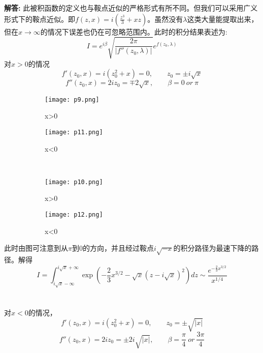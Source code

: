 \documentclass[12pt, a4paper, oneside]{ctexart}
\newenvironment{solution}
  {\par\noindent\textbf{解答:}\quad}
  {\par}
\begin{document}
\begin{solution}
    此被积函数的定义也与鞍点近似的严格形式有所不同。但我们可以采用广义形式下的鞍点近似。即$f(z,x)=i(\frac{z^3}{3}+xz)$。虽然没有$\lambda$这类大量能提取出来，但在$x\rightarrow\infty$的情况下误差也仍在可忽略范围内。此时的积分结果表述为:
    \begin{equation}
        I=e^{i\beta}\sqrt{\frac{2\pi}{|f''(z_0,\lambda)|}}e^{f(z_0,\lambda)}
    \end{equation}
    对$x>0$的情况
    \begin{equation}
        f'(z_0,x)=i(z_0^2+x)=0,\qquad z_0=\pm i\sqrt{x}
    \end{equation}
    \begin{equation}
        f''(z_0,x)=2iz_0=\mp 2\sqrt{x},\qquad \beta = 0 \ or \ \pi
    \end{equation}

    \begin{figure}
        \centering
        \begin{subfigure}[b]{0.45\textwidth}
            \texttt{[image: p9.png]}
            \caption{x>0}
            \label{fig:sub1}
        \end{subfigure}
        \hfill
        \begin{subfigure}[b]{0.45\textwidth}
            \texttt{[image: p11.png]}
            \caption{x<0}
            \label{fig:sub2}
        \end{subfigure}
        \\[0.5cm] %
        \begin{subfigure}[b]{0.45\textwidth}
            \texttt{[image: p10.png]}
            \caption{x>0}
            \label{fig:sub3}
        \end{subfigure}
        \hfill
        \begin{subfigure}[b]{0.45\textwidth}
            \texttt{[image: p12.png]}
            \caption{x<0}
            \label{fig:sub4}
        \end{subfigure}
        \caption{}
        \label{fig:square}
    \end{figure}

        此时由图可注意到从$\pi$到$0$的方向，并且经过鞍点$i\sqrt{-x}$的积分路径为最速下降的路径。解得
\[
    I=\int_{i\sqrt{x}-\infty}^{i\sqrt{x}+\infty}\exp(-\frac{2}{3}x^{3/2}-\sqrt{x}(z-i\sqrt{x})^2)dz
    \sim\frac{e^{-\frac{2}{3}x^{3 /2}}}{x^{1/4}}
\]
\qquad\\
\qquad\\
对\(x<0\)的情况，
\begin{equation}
    f'(z_0,x)=i(z_0^2+x)=0,\qquad z_0=\pm \sqrt{|x|}
\end{equation}
\begin{equation}
    f''(z_0,x)=2iz_0=\pm 2i\sqrt{|x|},\qquad \beta = \frac{\pi}{4} \ or \ \frac{3\pi}{4}
\end{equation}


\end{solution}
\end{document}
